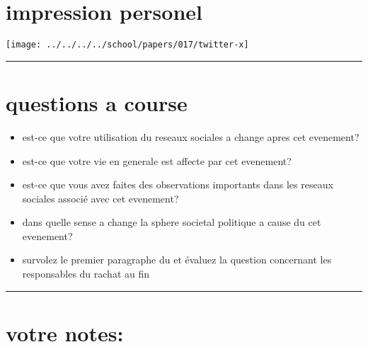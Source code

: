 \documentclass[]{tufte-handout}
\providecommand{\tightlist}{%
  \setlength{\itemsep}{0pt}\setlength{\parskip}{0pt}}
\begin{document}
\section{impression personel}\label{impression-personel}

\texttt{[image: ../../../../school/papers/017/twitter-x]}

\begin{center}\rule{0.5\linewidth}{0.5pt}\end{center}

\section{questions a course}\label{questions-a-course}

\begin{itemize}
\tightlist
\item
  est-ce que votre utilisation du reseaux sociales a change apres cet
  evenement?
\item
  est-ce que votre vie en generale est affecte par cet evenement?
\item
  est-ce que vous avez faites des observations importants dans les
  reseaux sociales associé avec cet evenement?
\item
  dans quelle sense a change la sphere societal politique a cause du cet
  evenement?
\item
  survolez le premier paragraphe du \citep[Q:][]{schenker_elon_2022} et
  évaluez la question concernant les responsables du rachat au fin
\end{itemize}

\begin{center}\rule{0.5\linewidth}{0.5pt}\end{center}

\section{votre notes:}\label{votre-notes}

\newpage

\renewcommand\refname{B. REF:}

\end{document}

